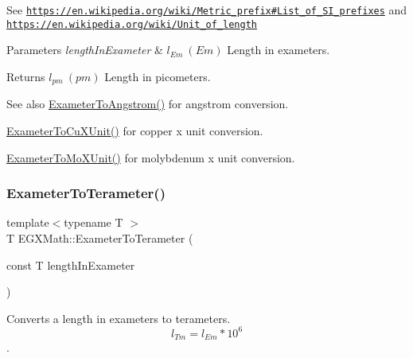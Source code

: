See \href{https://en.wikipedia.org/wiki/Metric_prefix#List_of_SI_prefixes}{\tt https\+://en.\+wikipedia.\+org/wiki/\+Metric\+\_\+prefix\#\+List\+\_\+of\+\_\+\+S\+I\+\_\+prefixes} and \href{https://en.wikipedia.org/wiki/Unit_of_length}{\tt https\+://en.\+wikipedia.\+org/wiki/\+Unit\+\_\+of\+\_\+length} 
\begin{DoxyParams}{Parameters}
{\em length\+In\+Exameter} & $ l_{Em}\ (Em)$ Length in exameters. \\
\hline
\end{DoxyParams}
\begin{DoxyReturn}{Returns}
$ l_{pm}\ (pm)$ Length in picometers. 
\end{DoxyReturn}
\begin{DoxySeeAlso}{See also}
\mbox{\hyperlink{group___e_g_x_math-_conversions-_length_conversions-_exameter-_non-_s_i_ga24d2ee057470ce37f99d31451e010a22}{Exameter\+To\+Angstrom()}} for angstrom conversion. 

\mbox{\hyperlink{group___e_g_x_math-_conversions-_length_conversions-_exameter-_non-_s_i_gacb2c9fea6b2c2d12ee485f378f5a6af0}{Exameter\+To\+Cu\+X\+Unit()}} for copper x unit conversion. 

\mbox{\hyperlink{group___e_g_x_math-_conversions-_length_conversions-_exameter-_non-_s_i_gadf73e46609660df6b7ae77ec7241183e}{Exameter\+To\+Mo\+X\+Unit()}} for molybdenum x unit conversion. 
\end{DoxySeeAlso}
\mbox{\label{group___e_g_x_math-_conversions-_length_conversions-_exameter-_s_i_gaf16e87fbeccc6175baa72ed6bb9db027}} 
\subsubsection{\texorpdfstring{Exameter\+To\+Terameter()}{ExameterToTerameter()}}
{\footnotesize\ttfamily template$<$typename T $>$ \\
T E\+G\+X\+Math\+::\+Exameter\+To\+Terameter (\begin{DoxyParamCaption}\item[{const T}]{length\+In\+Exameter }\end{DoxyParamCaption})}



Converts a length in exameters to terameters. \[ l_{Tm}=l_{Em} * 10^{6} \]. 

